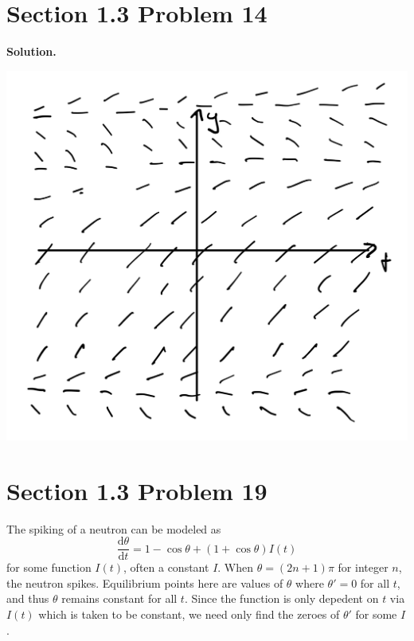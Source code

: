 \documentclass[11pt, letterpaper]{report}
\newenvironment{soln}[1][]{\noindent\textbf{Solution. }}{\hfill\qedsymbol}
\begin{document}
\section*{Section 1.3 Problem 14}
\begin{soln}
	\begin{center}	
	\includegraphics[scale=0.2]{image1.jpeg}	
	\end{center}
\end{soln}
\section*{Section 1.3 Problem 19}
The spiking of a neutron can be modeled as
\[
	\frac{\mathrm{d}\theta }{\mathrm{d}t} =1-\cos \theta +\left( 1+\cos \theta  \right) I(t)
\]
for some function $I(t)$, often a constant $I$. When $\theta =(2n+1)\pi $ for integer $n$, the neutron spikes. Equilibrium points here are values of $\theta $ where $\theta '=0$ for all $t$, and thus $\theta $ remains constant for all $t$. Since the function is only depedent on $t$ via $I(t)$ which is taken to be constant, we need only find the zeroes of $\theta '$ for some $I$.
\end{document}
